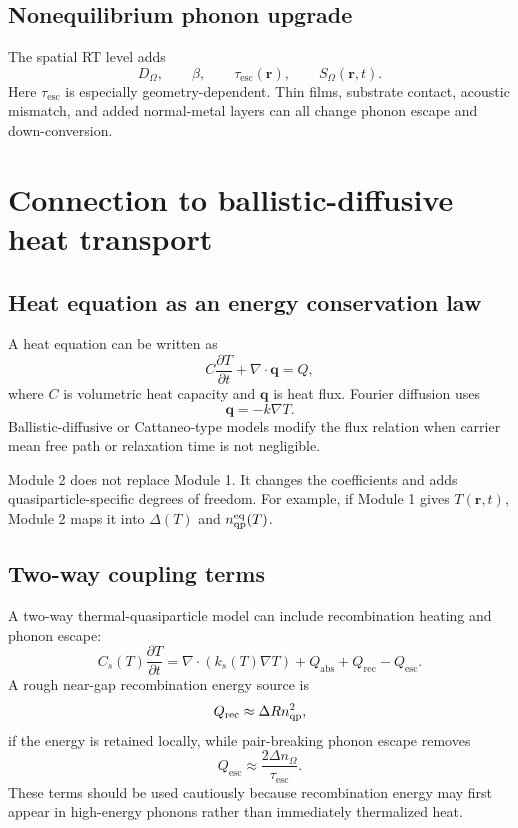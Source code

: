 \documentclass[11pt]{article}
\newcommand{\br}{{\bm{r}}}
\newcommand{\esc}{\mathrm{esc}}
\newcommand{\rec}{\mathrm{rec}}
\newcommand{\eq}{\mathrm{eq}}
\begin{document}
\subsection{Nonequilibrium phonon upgrade}
The spatial RT level adds
\begin{equation}
D_{\Omega},\qquad \beta,
\qquad \tau_{\esc}(\br),
\qquad S_{\Omega}(\br,t).
\end{equation}
Here $\tau_{\esc}$ is especially geometry-dependent. Thin films, substrate contact, acoustic mismatch, and added normal-metal layers can all change phonon escape and down-conversion.

\section{Connection to ballistic-diffusive heat transport}

\subsection{Heat equation as an energy conservation law}
A heat equation can be written as
\begin{equation}
C\frac{\partial T}{\partial t}+\nabla\cdot\bm{q}=Q,
\end{equation}
where $C$ is volumetric heat capacity and $\bm{q}$ is heat flux. Fourier diffusion uses
\begin{equation}
\bm{q}=-k\nabla T.
\end{equation}
Ballistic-diffusive or Cattaneo-type models modify the flux relation when carrier mean free path or relaxation time is not negligible.

Module 2 does not replace Module 1. It changes the coefficients and adds quasiparticle-specific degrees of freedom. For example, if Module 1 gives $T(\br,t)$, Module 2 maps it into $\Delta(T)$ and $n_{\qp}^{\eq}(T)$.

\subsection{Two-way coupling terms}
A two-way thermal-quasiparticle model can include recombination heating and phonon escape:
\begin{equation}
C_s(T)\frac{\partial T}{\partial t}=\nabla\cdot(k_s(T)\nabla T)+Q_{\mathrm{abs}}+Q_{\rec}-Q_{\esc}.
\end{equation}
A rough near-gap recombination energy source is
\begin{equation}
Q_{\rec}\approx \Delta Rn_{\qp}^2,
\end{equation}
if the energy is retained locally, while pair-breaking phonon escape removes
\begin{equation}
Q_{\esc}\approx\frac{2\Delta n_{\Omega}}{\tau_{\esc}}.
\end{equation}
These terms should be used cautiously because recombination energy may first appear in high-energy phonons rather than immediately thermalized heat.
\end{document}
